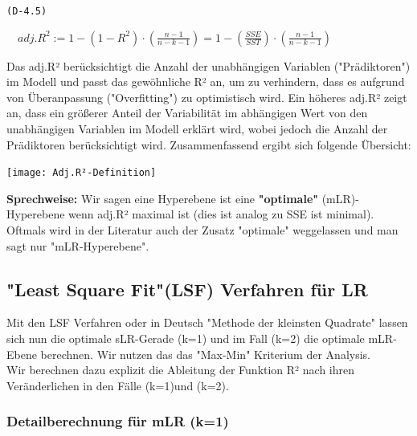 \documentclass[12pt]{article}
\begin{document}
\begin{center}
\texttt{(D-4.5)}
\begin{large}
\textbf{$ \quad adj.R^2 := 1 - (1 - R^2) \cdot (\frac{n-1}{n-k-1}) = 1 - (\frac{SSE}{SST}) \cdot (\frac{n-1}{n-k-1}) $}  \\[0.6cm] 
\end{large}     
\end{center}
%
Das adj.R² berücksichtigt die Anzahl der unabhängigen Variablen ("Prädiktoren") im Modell und passt das gewöhnliche R² an, um zu verhindern, dass es aufgrund von Überanpassung ("Overfitting") zu optimistisch wird. Ein höheres adj.R² zeigt an, dass ein größerer Anteil der Variabilität im abhängigen Wert von den unabhängigen Variablen im Modell erklärt wird, wobei jedoch die Anzahl der Prädiktoren berücksichtigt wird. Zusammenfassend ergibt sich folgende Übersicht:\\

\begin{center}
\texttt{[image: Adj.R²-Definition]}\\
\end{center}
%
\textbf{Sprechweise:} Wir sagen eine Hyperebene ist eine \textbf{"optimale"} (mLR)- Hyperebene wenn adj.R² maximal ist (dies ist analog zu SSE ist minimal). Oftmals wird in der Literatur auch der Zusatz "optimale" weggelassen und man sagt nur "mLR-Hyperebene".\\ 

\subsection{"Least Square Fit"(LSF) Verfahren für LR}

Mit den LSF Verfahren oder in Deutsch "Methode der kleinsten Quadrate" lassen sich nun die optimale sLR-Gerade (k=1) und im Fall (k=2) die optimale mLR-Ebene berechnen. Wir nutzen das das "Max-Min" Kriterium der Analysis.\\
Wir berechnen dazu explizit die Ableitung der Funktion R² nach ihren Veränderlichen in den Fälle (k=1)und (k=2). 

\subsubsection{Detailberechnung für mLR (k=1)}
\end{document}
